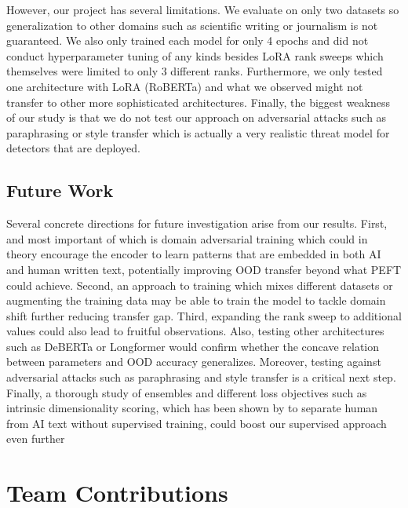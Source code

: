 \documentclass{article}
\begin{document}
However, our project has several limitations. We evaluate on only two datasets so generalization to other domains such as scientific writing or journalism is not guaranteed. We also only trained each model for only 4 epochs and did not conduct hyperparameter tuning of any kinds besides LoRA rank sweeps which themselves were limited to only 3 different ranks. Furthermore, we only tested one architecture with LoRA (RoBERTa) and what we observed might not transfer to other more sophisticated architectures. Finally, the biggest weakness of our study is that we do not test our approach on adversarial attacks such as paraphrasing or style transfer which is actually a very realistic threat model for detectors that are deployed.
\subsection{Future Work}
Several concrete directions for future investigation arise from our results. First, and most important of which is domain adversarial training which could in theory encourage the encoder to learn patterns that are embedded in both AI and human written text, potentially improving OOD transfer beyond what PEFT could achieve. Second, an approach to training which mixes different datasets or augmenting the training data may be able to train the model to tackle domain shift further reducing transfer gap. Third, expanding the rank sweep to additional values could also lead to fruitful observations. Also, testing other architectures such as DeBERTa or Longformer would confirm whether the concave relation between parameters and OOD accuracy generalizes. Moreover, testing against adversarial attacks such as paraphrasing and
style transfer is a critical next step. Finally, a thorough study of ensembles and different loss objectives such as intrinsic dimensionality scoring, which has been shown by \cite{tulchinskii2023intrinsic} to separate human from AI text without supervised training, could boost our supervised approach even further
\newpage
\section*{Team Contributions}
\end{document}
